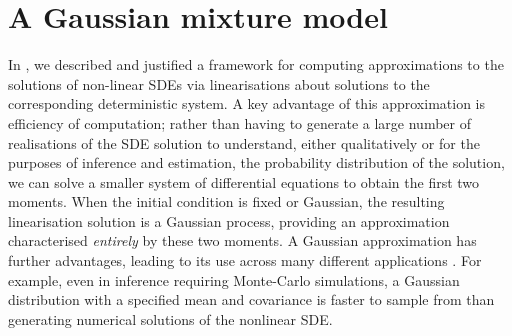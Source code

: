 \chapter{A Gaussian mixture model}\label{ch:gmm}
In , we described and justified a framework for computing approximations to the solutions of non-linear SDEs via linearisations about solutions to the corresponding deterministic system.
A key advantage of this approximation is efficiency of computation; rather than having to generate a large number of realisations of the SDE solution to understand, either qualitatively or for the purposes of inference and estimation, the probability distribution of the solution, we can solve a smaller system of differential equations to obtain the first two moments.
When the initial condition is fixed or Gaussian, the resulting linearisation solution is a Gaussian process, providing an approximation characterised \emph{entirely} by these two moments.
A Gaussian approximation has further advantages, leading to its use across many different applications \citep{KaszasHaller_2020_UniversalUpperEstimate,ArchambeauEtAl_2007_GaussianProcessApproximations,Jazwinski_2014_StochasticProcessesFiltering,SarkkaSolin_2019_AppliedStochasticDifferential,Sanz-AlonsoStuart_2017_GaussianApproximationsSmall}.
For example, even in inference requiring Monte-Carlo simulations, a Gaussian distribution with a specified mean and covariance is faster to sample from than generating numerical solutions of the nonlinear SDE.

